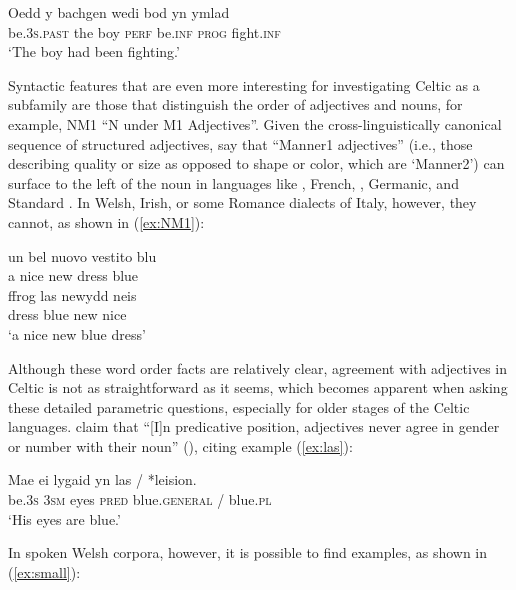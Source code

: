 \documentclass[output=paper,colorlinks,citecolor=brown]{langscibook}
\begin{document}
\ea
\settowidth\jamwidth{[Welsh]}
\gll Oedd y bachgen wedi bod yn ymlad \\
be.\textsc{3s}\textsc{.past} the boy \textsc{perf} be.\textsc{inf} \textsc{prog} fight.\textsc{inf}\\ \jambox{[Welsh]}
\glt `The boy had been fighting.'
\label{ex:118c}
\z

Syntactic features that are even more interesting for investigating Celtic as a subfamily are those that distinguish the order of adjectives and nouns, for example, NM1 ``N under M1 Adjectives''. Given the cross-linguistically canonical sequence of structured adjectives, \citet[41]{mm:ceolin_at_2021} say that ``Manner1 adjectives'' (i.e., those describing quality or size as opposed to shape or color, which are `Manner2') can surface to the left of the noun in languages like , French, , Germanic,  and Standard . In Welsh, Irish,  or some Romance dialects of Italy, however, they cannot, as shown in (\ref{ex:NM1}):

\ea
\ea
\settowidth{}
\gll un bel nuovo vestito blu \\
a nice new dress blue\\ \jambox{[Italian]}
\ex
\gll ffrog las newydd neis \\
dress blue new nice\\
\glt `a nice new blue dress'
\z
\label{ex:NM1}
\z

\largerpage
\noindent Although these word order facts are relatively clear, agreement with adjectives in Celtic is not as straightforward as it seems, which becomes apparent when asking these detailed parametric questions, especially for older stages of the Celtic languages. \citet{mm:borsleyetal2007syntax} claim that ``[I]n predicative position, adjectives never agree in gender or number with their noun'' (\citeyear[179]{mm:borsleyetal2007syntax}), citing example (\ref{ex:las}):

\ea 
\settowidth{}
\gll Mae ei lygaid yn las / *leision. \\
be.\textsc{3s} \textsc{3sm} eyes \textsc{pred} blue.\textsc{general} / blue.\textsc{pl}\\ 
\glt `His eyes are blue.' 
\label{ex:las}
\z 

\noindent In spoken Welsh corpora, however, it is possible to find examples, as shown in (\ref{ex:small}):
\end{document}
